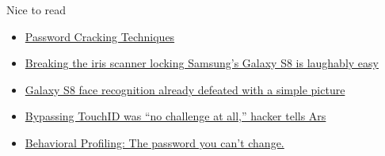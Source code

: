 \documentclass{curs}
\begin{document}
\begin{frame}{Nice to read}
  \begin{itemize}
    \item \href{http://books.expect-us.net/dl/Password_Cracking_Techniques.pdf}{Password Cracking Techniques}
    \item \href{https://arstechnica.com/information-technology/2017/05/breaking-the-iris-scanner-locking-samsungs-galaxy-s8-is-laughably-easy/}{Breaking the iris scanner locking Samsung’s Galaxy S8 is laughably easy}
    \item \href{https://arstechnica.com/gadgets/2017/03/video-shows-galaxy-s8-face-recognition-can-be-defeated-with-a-picture/}{Galaxy S8 face recognition already defeated with a simple picture}
    \item \href{https://arstechnica.com/information-technology/2013/09/touchid-hack-was-no-challenge-at-all-hacker-tells-ars/}{Bypassing TouchID was “no challenge at all,” hacker tells Ars}
    \item \href{https://paul.reviews/behavioral-profiling-the-password-you-cant-change/}{Behavioral Profiling: The password you can't change.}
  \end{itemize}
\end{frame}
\end{document}
